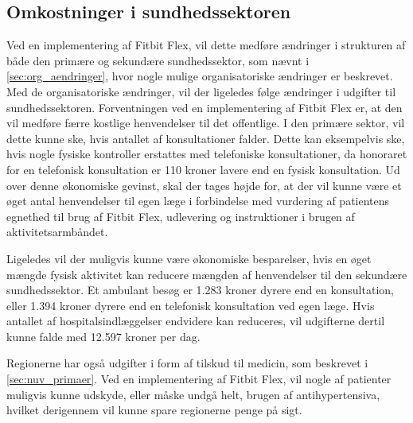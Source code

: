 \subsection{Omkostninger i sundhedssektoren}



Ved en implementering af Fitbit Flex, vil dette medføre ændringer i strukturen af både den primære og sekundære sundhedssektor, som nævnt i \autoref{sec:org_aendringer}, hvor nogle mulige organisatoriske ændringer er beskrevet. Med de organisatoriske ændringer, vil der ligeledes følge ændringer i udgifter til sundhedssektoren. 
Forventningen ved en implementering af Fitbit Flex er, at den vil medføre færre kostlige henvendelser til det offentlige. 
I den primære sektor, vil dette kunne ske, hvis antallet af konsultationer falder. Dette kan eksempelvis ske, hvis nogle fysiske kontroller erstattes med telefoniske konsultationer, da honoraret for en telefonisk konsultation er 110 kroner lavere end en fysisk konsultation. Ud over denne økonomiske gevinst, skal der tages højde for, at der vil kunne være et øget antal henvendelser til egen læge i forbindelse med vurdering af patientens egnethed til brug af Fitbit Flex, udlevering og instruktioner i brugen af aktivitetsarmbåndet. 
 
Ligeledes vil der muligvis kunne være økonomiske besparelser, hvis en øget mængde fysisk aktivitet kan reducere mængden af henvendelser til den sekundære sundhedssektor. Et ambulant besøg er 1.283 kroner dyrere end en konsultation, eller 1.394 kroner dyrere end en telefonisk konsultation ved egen læge. Hvis antallet af hospitalsindlæggelser endvidere kan reduceres, vil udgifterne dertil kunne falde med 12.597 kroner per dag. 

Regionerne har også udgifter i form af tilskud til medicin, som beskrevet i \autoref{sec:nuv_primaer}. Ved en implementering af Fitbit Flex, vil nogle af patienter muligvis kunne udskyde, eller måske undgå helt, brugen af antihypertensiva, hvilket derigennem vil kunne spare regionerne penge på sigt.

